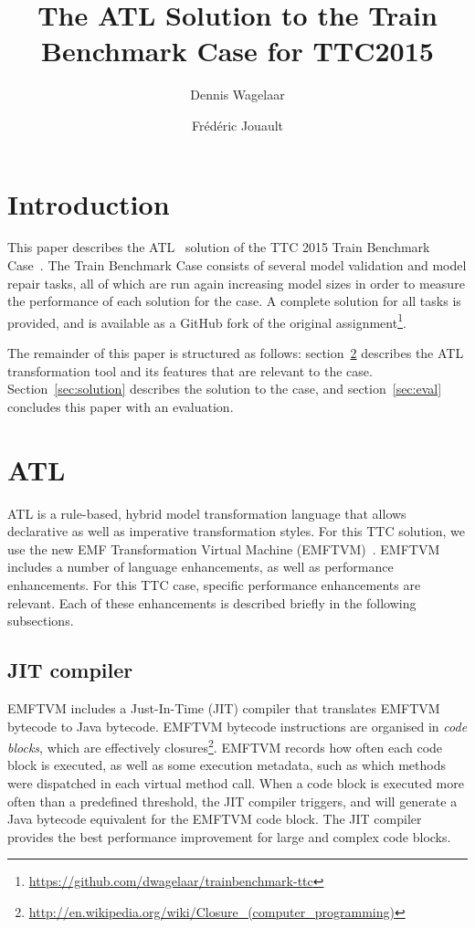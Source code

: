 \documentclass[submission,copyright,creativecommons]{eptcs}
\title{The {ATL} Solution to the Train Benchmark Case for {TTC2015}}
\author{Dennis Wagelaar
\institute{HealthConnect\\
Vilvoorde, Belgium}
\email{dennis.wagelaar@healthconnect.be}
\and
Fr\'{e}d\'{e}ric Jouault
\institute{ESEO-Tech\\
Angers, France}
\email{Frederic.Jouault@eseo.fr}
}
\begin{document}
\maketitle

\begin{abstract}
\end{abstract}

\section{Introduction}
\label{sec:intro}

This paper describes the ATL~\cite{journal/scp/Jouault2008} solution of the TTC 2015 Train Benchmark Case~\cite{conf/ttc/Szarnyas2015}. The Train Benchmark Case consists of several model validation and model repair tasks, all of which are run again increasing model sizes in order to measure the performance of each solution for the case. A complete solution for all tasks is provided, and is available as a GitHub fork of the original assignment\footnote{\url{https://github.com/dwagelaar/trainbenchmark-ttc}}.

The remainder of this paper is structured as follows: section~\ref{sec:atl} describes the ATL transformation tool and its features that are relevant to the case. Section~\ref{sec:solution} describes the solution to the case, and section~\ref{sec:eval} concludes this paper with an evaluation.

\section{ATL}
\label{sec:atl} 

ATL is a rule-based, hybrid model transformation language that allows declarative as well as imperative transformation styles. For this TTC solution, we use the new EMF Transformation Virtual Machine (EMFTVM)~\cite{conf/models/Wagelaar2011}. EMFTVM includes a number of language enhancements, as well as performance enhancements. For this TTC case, specific performance enhancements are relevant. Each of these enhancements is described briefly in the following subsections.

\subsection{JIT compiler}

EMFTVM includes a Just-In-Time (JIT) compiler that translates EMFTVM bytecode to Java bytecode. EMFTVM bytecode instructions are organised in \emph{code blocks}, which are effectively closures\footnote{\url{http://en.wikipedia.org/wiki/Closure\_(computer_programming)}}. EMFTVM records how often each code block is executed, as well as some execution metadata, such as which methods were dispatched in each virtual method call. When a code block is executed more often than a predefined threshold, the JIT compiler triggers, and will generate a Java bytecode equivalent for the EMFTVM code block. The JIT compiler provides the best performance improvement for large and complex code blocks.
\end{document}
